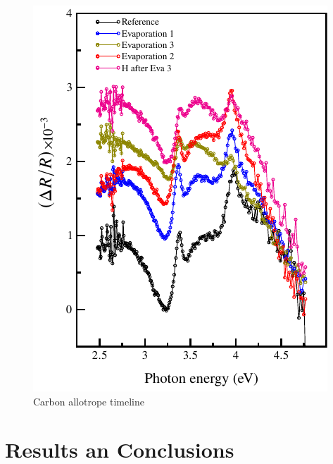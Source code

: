 \begin{figure}
	\centering
	\includegraphics[width=0.65\linewidth]{FIGURES/Anexo-CdTe/rds-evaporated-cdte-5.pdf}
	\caption{Carbon allotrope timeline}
	\label{fig:introfig32}
\end{figure}

\section{Results an Conclusions}